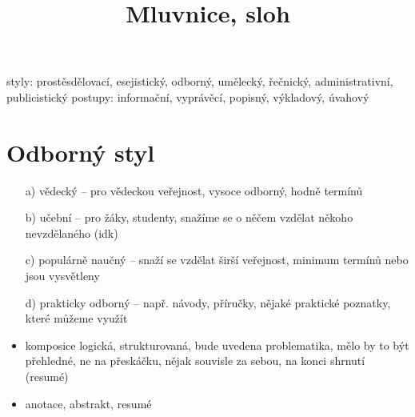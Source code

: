 \documentclass{article}
\title{\vspace{-2cm}Mluvnice, sloh\vspace{-1.7cm}}
\date{}
\author{}
\begin{document}
\maketitle
styly: prostěsdělovací, esejistický, odborný, umělecký, řečnický, administrativní, publicistický
postupy: informační, vyprávěcí, popisný, výkladový, úvahový

\part{Odborný styl}
\begin{itemize}
  \item[a)] vědecký -- pro vědeckou veřejnost, vysoce odborný, hodně termínů
  \item[b)] učební -- pro žáky, studenty, snažíme se o něčem vzdělat někoho nevzdělaného (idk)
  \item[c)] populárně naučný -- snaží se vzdělat širší veřejnost, minimum termínů nebo jsou vysvětleny
  \item[d)] prakticky odborný -- např. návody, příručky, nějaké praktické poznatky, které můžeme využít
\end{itemize}
\begin{itemize}
  \item komposice logická, strukturovaná, bude uvedena problematika, mělo by to být přehledné, ne na přeskáčku, nějak souvisle za sebou, na konci shrnutí (resumé)
  \item anotace, abstrakt, resumé
\end{itemize}
\end{document}
